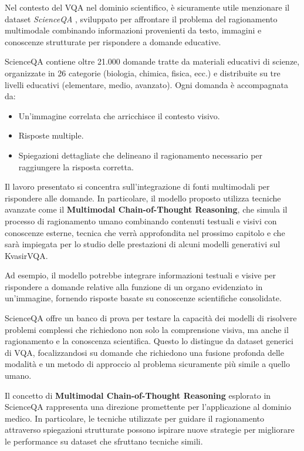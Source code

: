 \documentclass[../main.tex]{subfiles}
\begin{document}
Nel contesto del VQA nel dominio scientifico, è sicuramente utile menzionare il dataset \textit{ScienceQA} \cite{lu2022learnexplainmultimodalreasoning}, sviluppato per affrontare il problema del ragionamento multimodale combinando informazioni provenienti da testo, immagini e conoscenze strutturate per rispondere a domande educative. 

ScienceQA contiene oltre 21.000 domande tratte da materiali educativi di scienze, organizzate in 26 categorie (biologia, chimica, fisica, ecc.) e distribuite su tre livelli educativi (elementare, medio, avanzato). Ogni domanda è accompagnata da:
\begin{itemize}
    \item Un'immagine correlata che arricchisce il contesto visivo.
    \item Risposte multiple.
    \item Spiegazioni dettagliate che delineano il ragionamento necessario per raggiungere la risposta corretta.
\end{itemize}

Il lavoro presentato si concentra sull'integrazione di fonti multimodali per rispondere alle domande. In particolare, il modello proposto utilizza tecniche avanzate come il \textbf{Multimodal Chain-of-Thought Reasoning}, che simula il processo di ragionamento umano combinando contenuti testuali e visivi con conoscenze esterne, tecnica che verrà approfondita nel prossimo capitolo e che sarà impiegata per lo studio delle prestazioni di alcuni modelli generativi sul KvasirVQA.

Ad esempio, il modello potrebbe integrare informazioni testuali e visive per rispondere a domande relative alla funzione di un organo evidenziato in un'immagine, fornendo risposte basate su conoscenze scientifiche consolidate.

ScienceQA offre un banco di prova per testare la capacità dei modelli di risolvere problemi complessi che richiedono non solo la comprensione visiva, ma anche il ragionamento e la conoscenza scientifica. Questo lo distingue da dataset generici di VQA, focalizzandosi su domande che richiedono una fusione profonda delle modalità e un metodo di approccio al problema sicuramente più simile a quello umano.

Il concetto di \textbf{Multimodal Chain-of-Thought Reasoning} esplorato in ScienceQA rappresenta una direzione promettente per l'applicazione al dominio medico. In particolare, le tecniche utilizzate per guidare il ragionamento attraverso spiegazioni strutturate possono ispirare nuove strategie per migliorare le performance su dataset che sfruttano tecniche simili.
\end{document}
